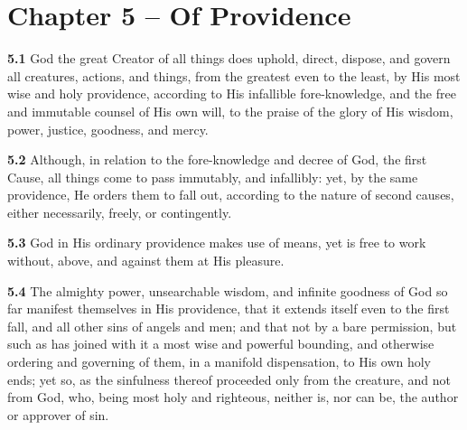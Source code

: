 \section{Chapter 5 -- Of Providence} 

\par\textbf{5.1} God the great Creator of all things does uphold, direct, dispose, and govern all creatures, actions, and things, from the greatest even to the least, by His most wise and holy providence, according to His infallible fore-knowledge, and the free and immutable counsel of His own will, to the praise of the glory of His wisdom, power, justice, goodness, and mercy.   

\par\textbf{5.2} Although, in relation to the fore-knowledge and decree of God, the first Cause, all things come to pass immutably, and infallibly: yet, by the same providence, He orders them to fall out, according to the nature of second causes, either necessarily, freely, or contingently.   

\par\textbf{5.3} God in His ordinary providence makes use of means, yet is free to work without, above, and against them at His pleasure.   

\par\textbf{5.4} The almighty power, unsearchable wisdom, and infinite goodness of God so far manifest themselves in His providence, that it extends itself even to the first fall, and all other sins of angels and men; and that not by a bare permission, but such as has joined with it a most wise and powerful bounding, and otherwise ordering and governing of them, in a manifold dispensation, to His own holy ends; yet so, as the sinfulness thereof proceeded only from the creature, and not from God, who, being most holy and righteous, neither is, nor can be, the author or approver of sin.

